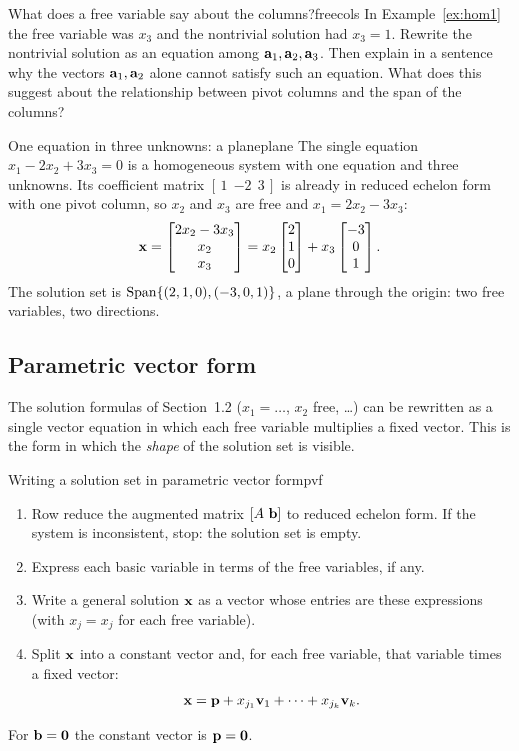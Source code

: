 \documentclass[11pt]{article}
\begin{document}
\begin{think}{What does a free variable say about the columns?}{freecols}
In Example~\ref{ex:hom1} the free variable was $x_3$ and the nontrivial solution had $x_3=1$. Rewrite the nontrivial solution as an equation among $\mathbf{a}_1,\mathbf{a}_2,\mathbf{a}_3$.
Then explain in a sentence why the vectors $\mathbf{a}_1,\mathbf{a}_2$ alone cannot satisfy such an equation. What does this suggest about the relationship between pivot columns and the span of the columns?
\end{think}

\begin{exmp}{One equation in three unknowns: a plane}{plane}
The single equation $x_1-2x_2+3x_3=0$ is a homogeneous system with one equation and three unknowns. Its coefficient matrix $[\,1\ \ {-2}\ \ 3\,]$ is already in reduced echelon form with one pivot column,
so $x_2$ and $x_3$ are free and $x_1=2x_2-3x_3$:
\[
\mathbf{x}=\begin{bmatrix}2x_2-3x_3\\x_2\\x_3\end{bmatrix}=x_2\begin{bmatrix}2\\1\\0\end{bmatrix}+x_3\begin{bmatrix}-3\\0\\1\end{bmatrix}.
\]
The solution set is $\operatorname{Span}\{(2,1,0),(-3,0,1)\}$, a plane through the origin: two free variables, two directions.
\end{exmp}

\subsection*{Parametric vector form}

The solution formulas of Section~1.2 ($x_1=\dots$, $x_2$ free, \dots) can be rewritten as a single vector equation in which each free variable multiplies a fixed vector. This is the
form in which the \emph{shape} of the solution set is visible.

\begin{proc}{Writing a solution set in parametric vector form}{pvf}
\begin{enumerate}
  \item Row reduce the augmented matrix $[A\ \bv{b}]$ to reduced echelon form. If the system is inconsistent, stop: the solution set is empty.
  \item Express each basic variable in terms of the free variables, if any.
  \item Write a general solution $\mathbf{x}$ as a vector whose entries are these expressions (with $x_j=x_j$ for each free variable).
  \item Split $\mathbf{x}$ into a constant vector and, for each free variable, that variable times a fixed vector:
  \[
  \mathbf{x}=\mathbf{p}+x_{j_1}\mathbf{v}_1+\cdots+x_{j_k}\mathbf{v}_k.
  \]
\end{enumerate}
For $\mathbf{b}=\mathbf{0}$ the constant vector is $\mathbf{p}=\mathbf{0}$.
\end{proc}
\end{document}
